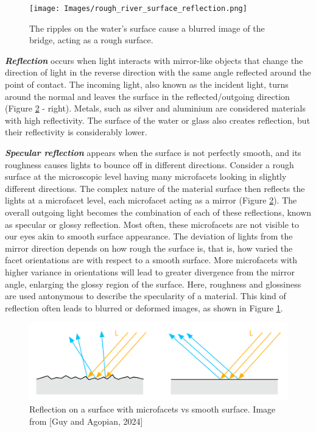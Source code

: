 \begin{figure}
\texttt{[image: Images/rough\_river\_surface\_reflection.png]}
\caption{The ripples on the water's surface cause a blurred image of the bridge, acting as a rough surface.}\label{fig:water_reflection}
\end{figure}  

\textbf{\textit{Reflection}} occurs when light interacts with mirror-like objects that change the direction of light in the reverse direction with the same angle reflected around the point of contact. The incoming light, also known as the incident light, turns around the normal and leaves the surface in the reflected/outgoing direction (Figure \ref{fig:microfacet} - right). Metals, such as silver and aluminium are considered materials with high reflectivity. The surface of the water or glass also creates reflection, but their reflectivity is considerably lower.

\textbf{\textit{Specular reflection}} appears when the surface is not perfectly smooth, and its roughness causes lights to bounce off in different directions. Consider a rough surface at the microscopic level having many microfacets looking in slightly different directions. The complex nature of the material surface then reflects the lights at a microfacet level, each microfacet acting as a mirror (Figure \ref{fig:microfacet}). The overall outgoing light becomes the combination of each of these reflections, known as specular or glossy reflection. Most often, these microfacets are not visible to our eyes akin to smooth surface appearance. The deviation of lights from the mirror direction depends on how rough the surface is, that is, how varied the facet orientations are with respect to a smooth surface. More microfacets with higher variance in orientations will lead to greater divergence from the mirror angle, enlarging the glossy region of the surface. Here, roughness and glossiness are used antonymous to describe the specularity of a material. This kind of reflection often leads to blurred or deformed images, as shown in Figure \ref{fig:water_reflection}. 



\begin{figure}
\includegraphics[width=0.9\linewidth]{Images/diagram_microfacet.png}
\caption{Reflection on a surface with microfacets vs smooth surface. Image from [Guy and Agopian, 2024]
 \citeauthor{googlePhysicallyBased} \cite{googlePhysicallyBased}}\label{fig:microfacet}
\end{figure} 

